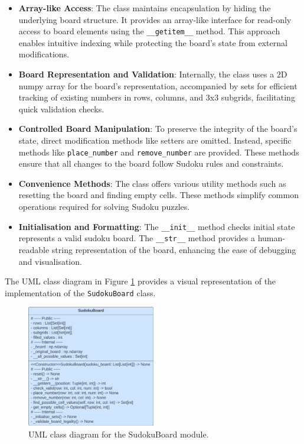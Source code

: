 \documentclass[11pt]{article}
\begin{document}
\begin{itemize}
\item \textbf{Array-like Access}: The class maintains encapsulation by hiding the underlying board structure. It provides an array-like interface for read-only access to board elements using the \texttt{\_\_getitem\_\_} method. This approach enables intuitive indexing while protecting the board's state from external modifications.

\item \textbf{Board Representation and Validation}: Internally, the class uses a 2D numpy array for the board's representation, accompanied by sets for efficient tracking of existing numbers in rows, columns, and 3x3 subgrids, facilitating quick validation checks.

\item \textbf{Controlled Board Manipulation}: To preserve the integrity of the board's state, direct modification methods like setters are omitted. Instead, specific methods like \texttt{place\_number} and \texttt{remove\_number} are provided. These methods ensure that all changes to the board follow Sudoku rules and constraints.

\item \textbf{Convenience Methods}: The class offers various utility methods such as resetting the board and finding empty cells. These methods simplify common operations required for solving Sudoku puzzles.

\item \textbf{Initialisation and Formatting}: The \texttt{\_\_init\_\_} method checks initial state represents a valid sudoku board. The \texttt{\_\_str\_\_} method provides a human-readable string representation of the board, enhancing the ease of debugging and visualisation.
\end{itemize}

The UML class diagram in Figure \ref{fig:sudoku_board_uml} provides a visual representation of the implementation of the \texttt{SudokuBoard} class.

\begin{figure}[H]
    \centering
    \includegraphics[width=0.5\textwidth]{figs/UML_sudoku_board.png}
    \caption{UML class diagram for the SudokuBoard module.}
    \label{fig:sudoku_board_uml}
\end{figure}
 
\end{document}
